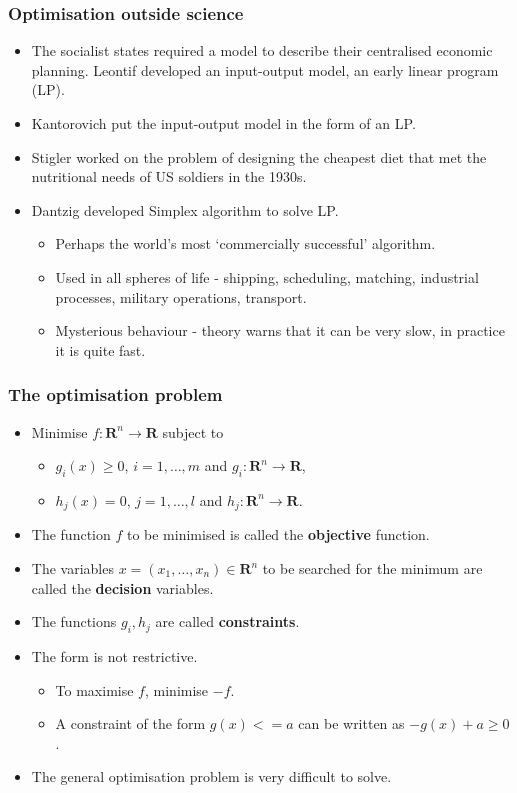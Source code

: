 \documentclass{beamer}
\newcommand{\sor}{\mathbf{R}}
\begin{document}
\begin{frame}
\frametitle{Optimisation outside science}
\begin{itemize}
\item The socialist states required a model to describe their centralised 
economic planning. Leontif developed an input-output model, an early linear
program (LP).
\item Kantorovich put the input-output model in the form of an LP.
\item Stigler worked on the problem of designing the cheapest diet that met
the nutritional needs of US soldiers in the 1930s.
\item Dantzig developed Simplex algorithm to solve LP.
\begin{itemize}
\item Perhaps the world's most `commercially successful' algorithm.
\item Used in all spheres of life - shipping, scheduling, matching, industrial
processes, military operations, transport.
\item Mysterious behaviour - theory warns that it can be very slow, in
practice it is quite fast.
\end{itemize}
\end{itemize}
\end{frame}

\begin{frame}
\frametitle{The optimisation problem}
\begin{itemize}
\item Minimise $f: \sor^n \rightarrow \sor$ subject to
\begin{itemize}
\item $g_i(x) \ge 0$, $i = 1, \ldots, m$ and $g_i: \sor^n \rightarrow \sor$,
\item $h_j(x) = 0$, $j = 1, \ldots, l$ and $h_j: \sor^n \rightarrow \sor$.
\end{itemize}
\item The function $f$ to be minimised is called the \textbf{objective}
function.
\item The variables $x = (x_1, \ldots, x_n) \in \sor^n$ to be searched for
the minimum are called the \textbf{decision} variables.
\item The functions $g_i, h_j$ are called \textbf{constraints}.
\item The form is not restrictive.
\begin{itemize}
\item To maximise $f$, minimise $-f$.
\item A constraint of the form $g(x) <= a$ can be written as $-g(x) + a \ge 0$.
\end{itemize}
\item The general optimisation problem is very difficult to solve.
\end{itemize}
\end{frame}
\end{document}
